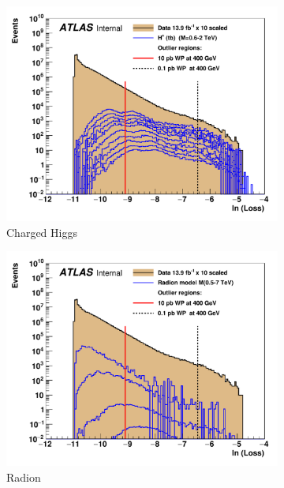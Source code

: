 \begin{figure}[H]
\begin{subfigure}[h]{0.45\linewidth}
    \includegraphics[scale=0.35]{figs/ch6/ar/plot_loss_cut_hsplus.pdf}%
    \caption{Charged Higgs}
    \end{subfigure}
    \hfill
    \begin{subfigure}[h]{0.45\linewidth}
    \includegraphics[scale=0.35]{figs/ch6/ar/plot_loss_cut_radion.pdf}%
    \caption{Radion}
    \end{subfigure}
    \hfill
    \begin{subfigure}[h]{0.45\linewidth}

\end{subfigure}
\end{figure}
